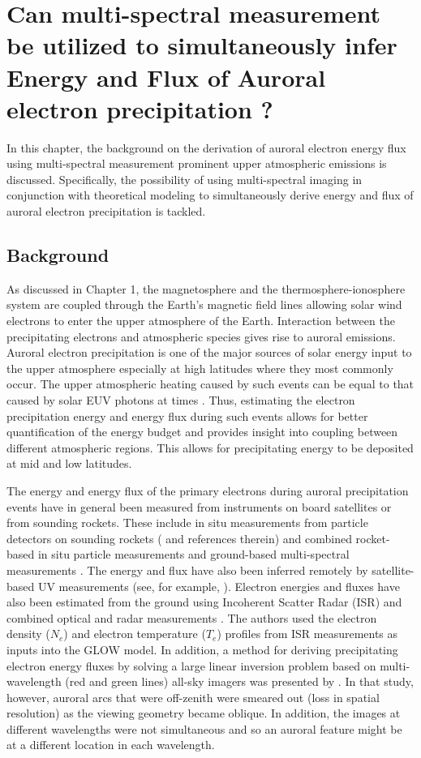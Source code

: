 \documentclass[crop=false,class=mitthesis,oneside,font=12pt]{standalone}
\begin{document}
\chapter{Can multi-spectral measurement be utilized to simultaneously infer Energy and Flux of Auroral electron precipitation ?} \label{chap:energy}

In this chapter, the background on the derivation of auroral electron energy flux using multi-spectral measurement prominent upper atmospheric emissions is discussed. Specifically, the possibility of using multi-spectral imaging in conjunction with theoretical modeling to simultaneously derive energy and flux of auroral electron precipitation is tackled. 

\section{Background}
As discussed in Chapter 1, the magnetosphere and the thermosphere-ionosphere system are coupled through the Earth's magnetic field lines allowing solar wind electrons to enter the upper atmosphere of the Earth. Interaction between the precipitating electrons and atmospheric species gives rise to auroral emissions. Auroral electron precipitation is one of the major sources of solar energy input to the upper atmosphere especially at high latitudes where they most commonly occur. The upper atmospheric heating caused by such events can be equal to that caused by solar EUV photons at times \citep{mayr_1978}. Thus, estimating the electron precipitation energy and energy flux during such events allows for better quantification of the energy budget and provides insight into coupling between different atmospheric regions. This allows for  precipitating energy to be deposited at mid and low latitudes.

The energy and energy flux of the primary electrons during auroral precipitation events have in general been measured from instruments on board satellites or  from sounding rockets. These include in situ measurements from particle detectors on sounding rockets (\citet{rocket,michell_2016} and references therein) and combined rocket-based in situ particle measurements and ground-based multi-spectral measurements \citep{grubbs_multi_spec}. The energy and flux have also been inferred remotely by satellite-based UV measurements (see, for example, \citet{guvi}).
Electron energies and fluxes have also been estimated from the ground using Incoherent Scatter Radar (ISR) \citep{semeter_2005} and combined optical and radar measurements \citep{pallamraju_2011}. The authors used the electron density ($N_e$) and electron temperature ($T_e$) profiles from ISR measurements as inputs into the GLOW model. In addition, a method for deriving precipitating electron energy fluxes by solving a large linear inversion problem based on multi-wavelength (red and green lines) all-sky imagers was presented by \citet{jan_rcons2001}. In that study, however, auroral arcs that were off-zenith were smeared out (loss in spatial resolution) as the viewing geometry became oblique. In addition, the images at different wavelengths were not simultaneous and so an auroral feature might be at a different location in each wavelength.
\end{document}
